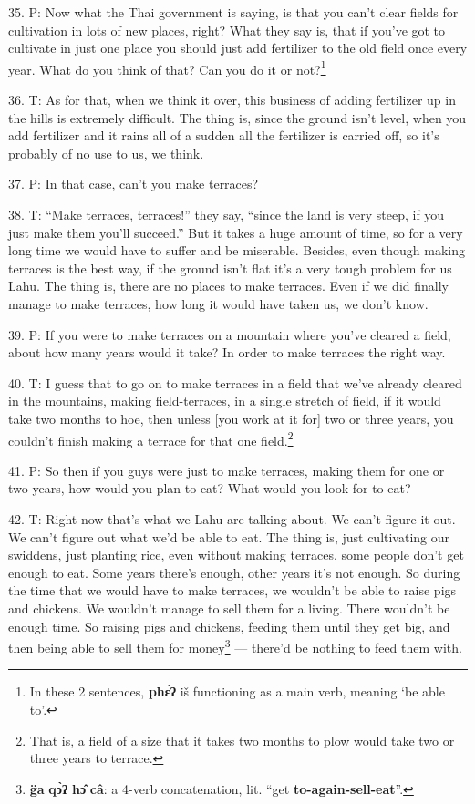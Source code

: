 35. P: Now what the Thai government is saying, is that you can't clear fields for
cultivation in lots of new places, right? What they say is, that if you've got
to cultivate in just one place you should just add fertilizer to the old field
once every year. What do you think of that? Can you do it or not?\footnote{In these 2 sentences, \textbf{phɛ̀ʔ} iš functioning as a main verb, meaning `be able to'.}

36. T: As for that, when we think it over, this business of adding fertilizer up
in the hills is extremely difficult. The thing is, since the ground isn't level,
when you add fertilizer and it rains all of a sudden all the fertilizer is carried
off, so it's probably of no use to us, we think.

37. P: In that case, can't you make terraces?

38. T: ``Make terraces, terraces!'' they say, ``since the land is very steep, if
you just make them you'll succeed.'' But it takes a huge amount of time, so for
a very long time we would have to suffer and be miserable. Besides, even though
making terraces is the best way, if the ground isn't flat it's a very tough problem
for us Lahu. The thing is, there are no places to make terraces. Even if we did
finally manage to make terraces, how long it would have taken us, we don't know.

39. P: If you were to make terraces on a mountain where you've cleared a field,
about how many years would it take? In order to make terraces the right way.

40. T: I guess that to go on to make terraces in a field that we've already cleared
in the mountains, making field-terraces, in a single stretch of field, if it would
take two months to hoe, then unless [you work at it for] two or three years, you
couldn't finish making a terrace for that one field.\footnote{That is, a field of a size that it takes two months to plow would take two or three years to terrace.}

41. P: So then if you guys were just to make terraces, making them for one or two
years, how would you plan to eat? What would you look for to eat?

42. T: Right now that's what we Lahu are talking about. We can't figure it out.
We can't figure out what we'd be able to eat. The thing is, just cultivating our
swiddens, just planting rice, even without making terraces, some people don't get
enough to eat. Some years there's enough, other years it's not enough. So during
the time that we would have to make terraces, we wouldn't be able to raise pigs
and chickens. We wouldn't manage to sell them for a living. There wouldn't be enough
time. So raising pigs and chickens, feeding them until they get big, and then being
able to sell them for money\footnote{\textbf{g̈a} \textbf{qɔ̀ʔ} \textbf{hɔ̂} \textbf{câ}: a 4-verb concatenation, lit. ``get \textbf{to-again-sell-eat}''.} --- there'd be nothing to feed them with.

